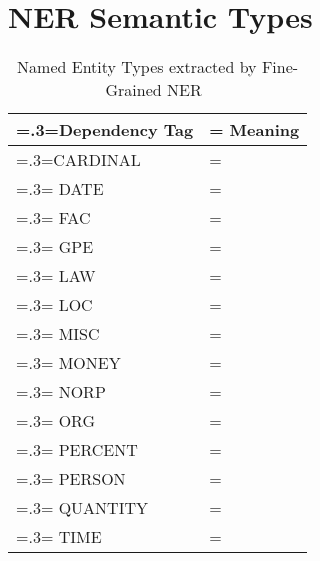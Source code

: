 \chapter{\vspace{-3px}NER Semantic Types}

\vspace{-3em}
\begin{table}[H]
    \centering
    \renewcommand{\arraystretch}{1.0}
    \begin{tabularx}{0.8\textwidth}{|>{\hsize=.3\hsize\linewidth=\hsize}X|>{\hsize=0.7\hsize\linewidth=\hsize}X|} 
     \hline
      \textbf{Dependency Tag} & \textbf{Meaning} \\
     \hline
        CARDINAL &  \\
        \hline
        DATE &  \\
        \hline
        FAC &  \\
        \hline
        GPE &  \\
        \hline
        LAW &  \\
        \hline
        LOC &  \\
        \hline
        MISC &  \\
        \hline
        MONEY & \\
        \hline
        NORP &  \\
        \hline
        ORG &  \\
        \hline
        PERCENT &  \\
        \hline
        PERSON &  \\
        \hline
        QUANTITY &  \\
        \hline
        TIME &  \\
    \hline
    \end{tabularx}
    \caption{Named Entity Types extracted by Fine-Grained NER~\cite{lample}}
    \label{appendix:semantic_types}
    \end{table}

    

